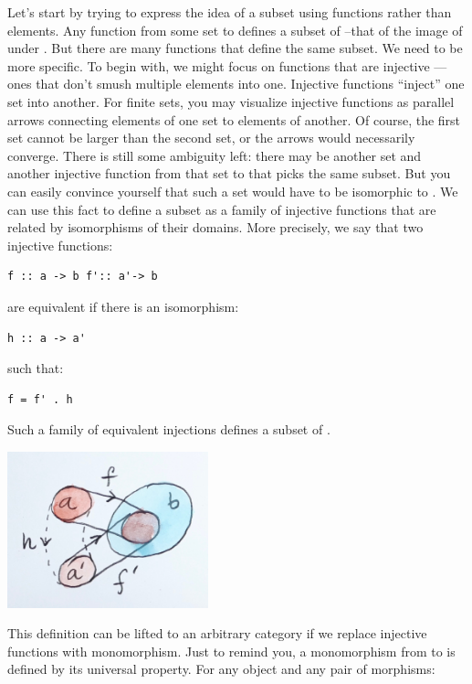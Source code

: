 Let's start by trying to express the idea of a subset using functions
rather than elements. Any function  from some set 
to  defines a subset of --that of the image of
 under . But there are many functions that define
the same subset. We need to be more specific. To begin with, we might
focus on functions that are injective --- ones that don't smush multiple
elements into one. Injective functions ``inject'' one set into another.
For finite sets, you may visualize injective functions as parallel
arrows connecting elements of one set to elements of another. Of course,
the first set cannot be larger than the second set, or the arrows would
necessarily converge. There is still some ambiguity left: there may be
another set  and another injective function
 from that set to  that picks the same
subset. But you can easily convince yourself that such a set would have
to be isomorphic to . We can use this fact to define a subset
as a family of injective functions that are related by isomorphisms of
their domains. More precisely, we say that two injective functions:

\begin{verbatim}
f :: a -> b f':: a'-> b
\end{verbatim}

are equivalent if there is an isomorphism:

\begin{verbatim}
h :: a -> a'
\end{verbatim}

such that:

\begin{verbatim}
f = f' . h
\end{verbatim}

Such a family of equivalent injections defines a subset of .

\includegraphics[width=2.29167in]{images/subsetinjection.jpg}

This definition can be lifted to an arbitrary category if we replace
injective functions with monomorphism. Just to remind you, a
monomorphism  from  to  is defined by its
universal property. For any object  and any pair of morphisms:

